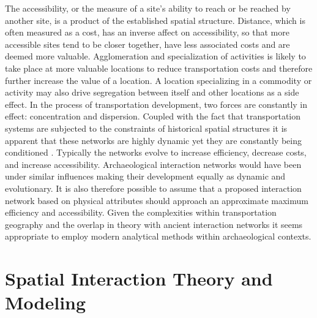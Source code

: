 \documentclass[12pt,a4paper]{thesis}
\begin{document}
The accessibility, or the measure of a site's ability to reach or be reached by another site, is a product of the established spatial structure. Distance, which is often measured as a cost, has an inverse affect on accessibility, so that more accessible sites tend to be closer together, have less associated costs and are deemed more valuable. Agglomeration and specialization of activities is likely to take place at more valuable locations to reduce transportation costs and therefore further increase the value of a location. A location specializing in a commodity or activity may also drive segregation between itself and other locations as a side effect. In the process of transportation development, two forces are constantly in effect: concentration and dispersion. Coupled with the fact that transportation systems are subjected to the constraints of historical spatial structures it is apparent that these networks are highly dynamic yet they are constantly being conditioned \cite[11-28]{RodComSla06}. Typically the networks evolve to increase efficiency, decrease costs, and increase accessibility. Archaeological interaction networks would have been under similar influences making their development equally as dynamic and evolutionary. It is also therefore possible to assume that a proposed interaction network based on physical attributes should approach an approximate maximum efficiency and accessibility. Given the complexities within transportation geography and the overlap in theory with ancient interaction networks it seems appropriate to employ modern analytical methods within archaeological contexts.



\section{Spatial Interaction Theory and Modeling}
\end{document}
